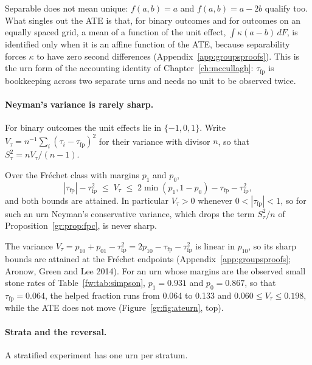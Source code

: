 Separable does not mean unique: $f(a,b)=a$ and $f(a,b)=a-2b$ qualify too. What singles out the ATE is that, for binary outcomes and for outcomes on an equally spaced grid, a mean of a function of the unit effect, $\int\kappa(a-b)\,dF$, is identified only when it is an affine function of the ATE, because separability forces $\kappa$ to have zero second differences (Appendix~\ref{app:groupsproofs}). This is the urn form of the accounting identity of Chapter~\ref{ch:mccullagh}: $\tau_{\mathrm{fp}}$ is bookkeeping across two separate urns and needs no unit to be observed twice.

\paragraph{Neyman's variance is rarely sharp.} For binary outcomes the unit effects lie in $\{-1,0,1\}$. Write $V_\tau=n^{-1}\sum_i(\tau_i-\tau_{\mathrm{fp}})^2$ for their variance with divisor $n$, so that $S_\tau^2=nV_\tau/(n-1)$.

\begin{proposition}\label{gr:prop:sharpvar}
Over the Fr\'echet class with margins $p_1$ and $p_0$,
\[
|\tau_{\mathrm{fp}}|-\tau_{\mathrm{fp}}^2\;\le\;V_\tau\;\le\;2\min(p_1,1-p_0)-\tau_{\mathrm{fp}}-\tau_{\mathrm{fp}}^2,
\]
and both bounds are attained. In particular $V_\tau>0$ whenever $0<|\tau_{\mathrm{fp}}|<1$, so for such an urn Neyman's conservative variance, which drops the term $S_\tau^2/n$ of Proposition~\ref{gr:prop:fpc}, is never sharp.
\end{proposition}

The variance $V_\tau=p_{10}+p_{01}-\tau_{\mathrm{fp}}^2=2p_{10}-\tau_{\mathrm{fp}}-\tau_{\mathrm{fp}}^2$ is linear in $p_{10}$, so its sharp bounds are attained at the Fr\'echet endpoints (Appendix~\ref{app:groupsproofs}; Aronow, Green and Lee 2014). For an urn whose margins are the observed small stone rates of Table~\ref{fw:tab:simpson}, $p_1=0.931$ and $p_0=0.867$, so that $\tau_{\mathrm{fp}}=0.064$, the helped fraction runs from 0.064 to 0.133 and $0.060\le V_\tau\le0.198$, while the ATE does not move (Figure~\ref{gr:fig:ateurn}, top).

\paragraph{Strata and the reversal.} A stratified experiment has one urn per stratum.

